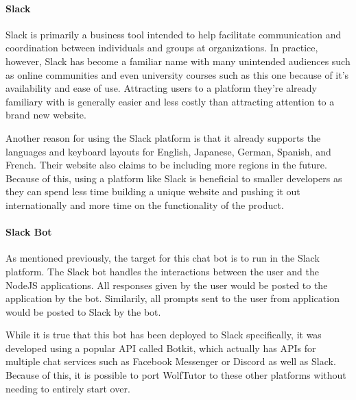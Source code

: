 \paragraph{Slack}
Slack is primarily a business tool intended to help facilitate
communication and coordination between individuals and groups at organizations.
In practice, however, Slack has become a familiar name with many unintended audiences such
as online communities and even university courses such as this one because of it's 
availability and ease of use. Attracting users to a platform they're already familiary with
is generally easier and less costly than attracting attention to a brand new website.

Another reason for using the Slack platform is that it already supports the languages and keyboard layouts for English, 
Japanese, German, Spanish, and French. Their website also claims to be 
including more regions in the future. Because of this, using a platform like Slack 
is beneficial to smaller developers as they can spend less time building a unique website 
and pushing it out internationally and more time on the functionality of the product. 

\paragraph{Slack Bot}
As mentioned previously, the target for this chat bot is to run in the Slack
platform. The Slack bot handles the interactions between the user and the NodeJS applications. 
All responses given by the user would be posted to the application by the bot. 
Similarily, all prompts sent to the user from application would be posted to Slack by the bot.

While it is true that this bot has been deployed to Slack specifically, it was
developed using a popular API called Botkit, which actually has APIs for
multiple chat services such as Facebook Messenger or Discord as well as Slack.
Because of this, it is possible to port WolfTutor to these other platforms
without needing to entirely start over.

